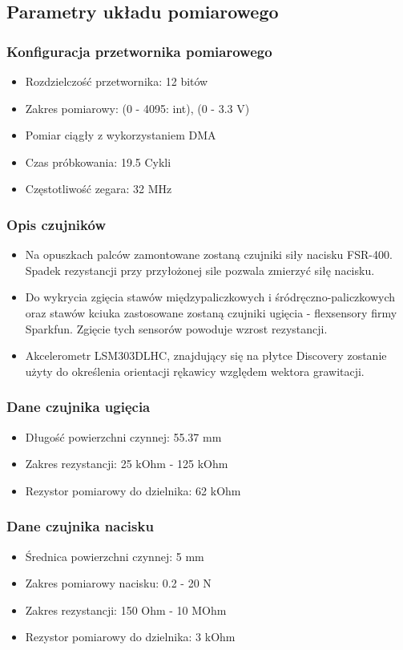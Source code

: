 \documentclass[12pt,a4paper]{article}
\begin{document}
\subsection{Parametry układu pomiarowego}
\subsubsection{Konfiguracja przetwornika pomiarowego}
\begin{itemize}
\item Rozdzielczość przetwornika: 12 bitów
\item Zakres pomiarowy: (0 - 4095: int), (0 - 3.3 V)
\item Pomiar ciągły z wykorzystaniem DMA
\item Czas próbkowania: 19.5 Cykli
\item Częstotliwość zegara: 32 MHz
\end{itemize}

\newpage
\subsubsection{Opis czujników}
\begin{itemize}
\item Na opuszkach palców zamontowane zostaną czujniki siły nacisku FSR-400. Spadek rezystancji przy przyłożonej sile pozwala zmierzyć siłę nacisku.
\item Do wykrycia zgięcia stawów międzypaliczkowych i śródręczno-paliczkowych oraz stawów kciuka zastosowane zostaną czujniki ugięcia - flexsensory firmy Sparkfun. Zgięcie tych sensorów powoduje wzrost rezystancji.
\item Akcelerometr LSM303DLHC, znajdujący się na płytce Discovery zostanie użyty do określenia orientacji rękawicy względem wektora grawitacji.
\end{itemize}
\subsubsection{Dane czujnika ugięcia}
\begin{itemize}
\item Długość powierzchni czynnej: 55.37 mm
\item Zakres rezystancji: 25 kOhm - 125 kOhm
\item Rezystor pomiarowy do dzielnika: 62 kOhm
\end{itemize}
\subsubsection{Dane czujnika nacisku}
\begin{itemize}
\item Średnica powierzchni czynnej: 5 mm
\item Zakres pomiarowy nacisku: 0.2 - 20 N
\item Zakres rezystancji: 150 Ohm - 10 MOhm
\item Rezystor pomiarowy do dzielnika: 3 kOhm
\end{itemize}
\end{document}
